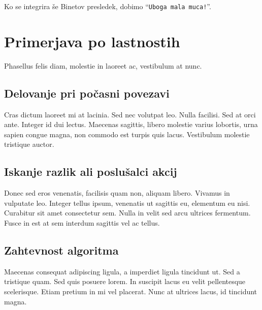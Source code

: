 \documentclass[a4paper, 12pt, twoside]{book}
\begin{document}
Ko se integrira še Binetov presledek, dobimo “{\tt Uboga mala muca!}”.

\chapter{Primerjava po lastnostih}

Phasellus felis diam, molestie in laoreet ac, vestibulum at nunc.

\section{Delovanje pri počasni povezavi}

Cras dictum laoreet mi at lacinia. Sed nec volutpat leo. Nulla facilisi. Sed at orci ante. Integer id dui lectus. Maecenas sagittis, libero molestie varius lobortis, urna sapien congue magna, non commodo est turpis quis lacus. Vestibulum molestie tristique auctor.

\section{Iskanje razlik ali poslušalci akcij}

Donec sed eros venenatis, facilisis quam non, aliquam libero. Vivamus in vulputate leo. Integer tellus ipsum, venenatis ut sagittis eu, elementum eu nisi. Curabitur sit amet consectetur sem. Nulla in velit sed arcu ultrices fermentum. Fusce in est at sem interdum sagittis vel ac tellus.

\section{Zahtevnost algoritma}

Maecenas consequat adipiscing ligula, a imperdiet ligula tincidunt ut. Sed a tristique quam. Sed quis posuere lorem. In suscipit lacus eu velit pellentesque scelerisque. Etiam pretium in mi vel placerat. Nunc at ultrices lacus, id tincidunt magna.

\end{document}
